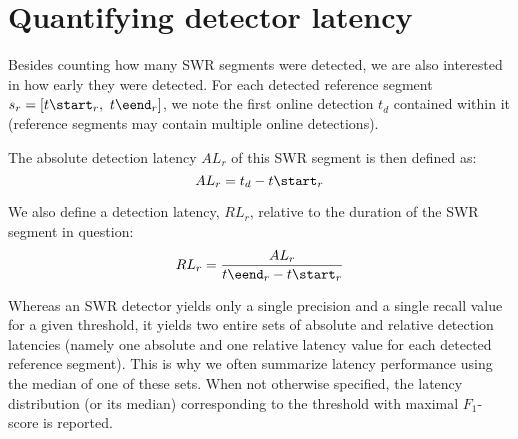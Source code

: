 \section{Quantifying detector latency}

Besides counting how many SWR segments were detected, we are also interested in how early they were detected. For each detected reference segment $s_r = [ t\start_r,\ t\eend_r ]$, we note the first online detection $t_d$ contained within it (reference segments may contain multiple online detections).

The absolute detection latency $AL_r$ of this SWR segment is then defined as:
\begin{equation}
AL_r = t_d - t\start_r 
\end{equation}

We also define a detection latency, $RL_r$, relative to the duration of the SWR segment in question:
\begin{equation}
RL_r = \frac{AL_r}{t\eend_r - t\start_r} 
\end{equation}

Whereas an SWR detector yields only a single precision and a single recall value for a given threshold, it yields two entire sets of absolute and relative detection latencies (namely one absolute and one relative latency value for each detected reference segment). This is why we often summarize latency performance using the median of one of these sets. When not otherwise specified, the latency distribution (or its median) corresponding to the threshold with maximal $F_1$-score is reported.

